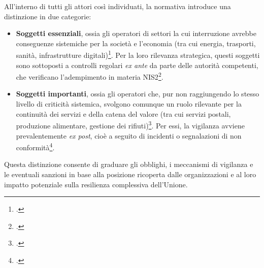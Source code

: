 All’interno di tutti gli attori così individuati, la normativa introduce una distinzione in due categorie:
\begin{itemize}
    \item \textbf{Soggetti essenziali}, ossia gli operatori di settori la cui interruzione avrebbe conseguenze sistemiche 
        per la società e l’economia (tra cui energia, trasporti, sanità, infrastrutture digitali)\footcite[Allegato I]{nis2-directive}. 
        Per la loro rilevanza strategica, questi soggetti sono sottoposti a controlli regolari \textit{ex ante} da parte 
        delle autorità competenti, che verificano l'adempimento in materia NIS2\footcite[art. 32]{nis2-directive}.
    \item \textbf{Soggetti importanti}, ossia gli operatori che, pur non raggiungendo lo stesso livello di 
        criticità sistemica, svolgono comunque un ruolo rilevante per la continuità dei servizi e della catena 
        del valore (tra cui servizi postali, produzione alimentare, gestione dei rifiuti)\footcite[Allegato II]{nis2-directive}. 
        Per essi, la vigilanza avviene prevalentemente \textit{ex post}, cioè a seguito di incidenti o segnalazioni di non conformità\footcite[art. 33]{nis2-directive}.
\end{itemize}
Questa distinzione consente di graduare gli obblighi, i meccanismi di vigilanza e le eventuali sanzioni in 
base alla posizione ricoperta dalle organizzazioni e al loro impatto potenziale sulla resilienza complessiva dell’Unione.


